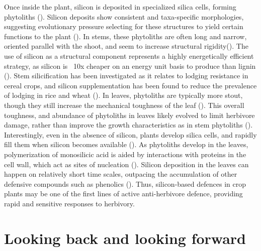 \documentclass[12pt, letterpaper, ]{report}
\begin{document}
Once inside the plant, silicon is deposited in specialized silica cells, forming phytoliths (\cite{waterman_short-term_2021}). Silicon deposits show consistent and taxa-specific morphologies, suggesting evolutionary pressure selecting for these structures to yield certain functions to the plant (\cite{piperno_phytoliths_2006}). In stems, these phytoliths are often long and narrow, oriented parallel with the shoot, and seem to increase structural rigidity(\cite{stromberg_functions_2016}). The use of silicon as a structural component represents a highly energetically efficient strategy, as silicon is ~10x cheaper on an energy unit basis to produce than lignin (\cite{stromberg_functions_2016}). Stem silicification has been investigated as it relates to lodging resistance in cereal crops, and silicon supplementation has been found to reduce the prevalence of lodging in rice and wheat (\cite{dorairaj_influence_2017,muszynska_mechanistic_2021}). In leaves, phytoliths are typically more stout, though they still increase the mechanical toughness of the leaf (\cite{simpson_still_2017}). This overall toughness, and abundance of phytoliths in leaves likely evolved to limit herbivore damage, rather than improve the growth characteristics as in stem phytoliths (\cite{stromberg_functions_2016}). Interestingly, even in the absence of silicon, plants develop silica cells, and rapidly fill them when silicon becomes available (\cite{waterman_short-term_2021-1}). As phytoliths develop in the leaves, polymerization of monosilicic acid is aided by interactions with proteins in the cell wall, which act as sites of nucleation (\cite{nawaz_phytolith_2019}). Silicon deposition in the leaves can happen on relatively short time scales, outpacing the accumulation of other defensive compounds such as phenolics (\cite{waterman_short-term_2021}). Thus, silicon-based defences in crop plants may be one of the first lines of active anti-herbivore defence, providing rapid and sensitive responses to herbivory. 

\section{Looking back and looking forward}
\end{document}
